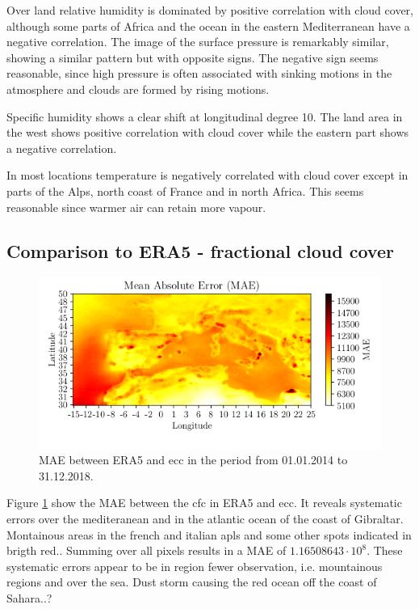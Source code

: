 Over land relative humidity is dominated by positive correlation with cloud cover, although some parts of Africa and the ocean in the eastern Mediterranean have a negative correlation. The image of the surface pressure is remarkably similar, showing a similar pattern but with opposite signs. The negative sign seems reasonable, since high pressure is often associated with sinking motions in the atmosphere and clouds are formed by rising motions. 

Specific humidity shows a clear shift at longitudinal degree 10. The land area in the west shows positive correlation with cloud cover while the eastern part shows a negative correlation. 

In most locations temperature is negatively correlated with cloud cover except in parts of the Alps, north coast of France and in north Africa. This seems reasonable since warmer air can retain more vapour.%

\subsection{Comparison to ERA5 - fractional cloud cover}
\begin{figure}
    \centering
    \includegraphics{python_figs/mae_era_vs_target_test_period_2014_to_2018.png}
    \caption{MAE between ERA5 and \acrshort{ecc} in the period from 01.01.2014 to 31.12.2018.}
    \label{fig:mae_era_target}
\end{figure}

Figure \ref{fig:mae_era_target} show the MAE between the \acrshort{cfc} in ERA5 and \acrshort{ecc}. It reveals systematic errors over the mediteranean and in the atlantic ocean of the coast of Gibraltar. Montainous areas in the french and italian apls and some other spots indicated in brigth red.. Summing over all pixels results in a MAE of $1.16508643\cdot10^8$. These systematic errors appear to be in region fewer observation, i.e. mountainous regions and over the sea. Dust storm causing the red ocean off the coast of Sahara..?

